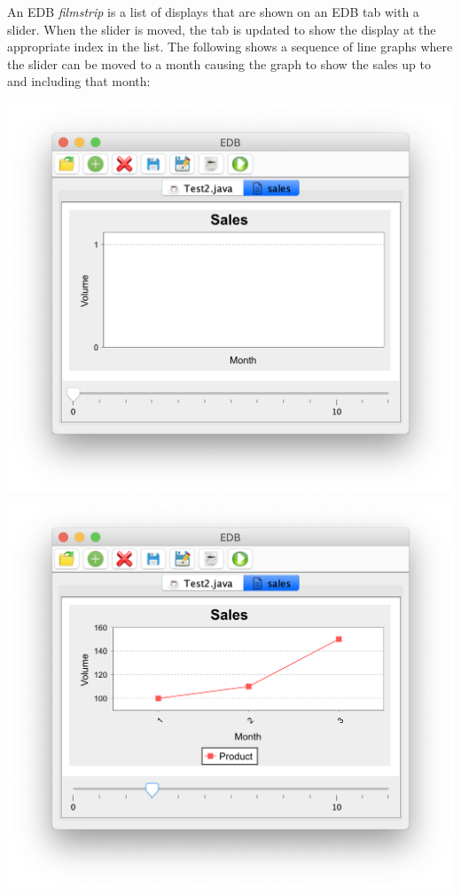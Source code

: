 \documentclass[5p,times]{elsarticle}
\begin{document}
An EDB  {\it filmstrip} is a list of displays that are shown on an EDB tab with a slider. When the slider is moved, the tab is updated to show the display at the appropriate index in the list. The following shows a sequence of line graphs where the slider can be moved to a month causing the graph to show the sales up to and including that month:
\begin{center}
\includegraphics[width=0.9\columnwidth]{film1}
\includegraphics[width=0.9\columnwidth]{film2}

\end{center}
\end{document}
